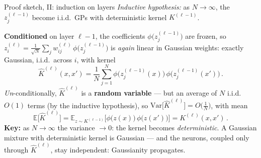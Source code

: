 \documentclass[11pt]{beamer}
\newcommand{\E}{\mathbb{E}}
\newcommand{\hl}[1]{{\color{blue!60!black}\textbf{#1}}}
\begin{document}
\begin{frame}{Proof sketch, II: induction on layers}
  \emph{Inductive hypothesis:} as $N\to\infty$, the $z^{(\ell-1)}_j$
  become i.i.d.\ GPs with deterministic kernel $K^{(\ell-1)}$.

  \hl{Conditioned} on layer $\ell-1$, the coefficients
  $\phi\big(z^{(\ell-1)}_j\big)$ are frozen, so
  $z^{(\ell)}_i = \frac{1}{\sqrt N}\sum_j w^{(\ell)}_{ij}\,
  \phi\big(z^{(\ell-1)}_j\big)$ is \emph{again} linear in Gaussian
  weights: exactly Gaussian, i.i.d.\ across $i$, with kernel
  {\small
  \[
    \widehat K^{(\ell)}(x,x') = \frac{1}{N}\sum_{j=1}^{N}
    \phi\big(z^{(\ell-1)}_j(x)\big)\,\phi\big(z^{(\ell-1)}_j(x')\big)\,.
  \]}
  \emph{Un}-conditionally, $\widehat K^{(\ell)}$ is a \hl{random
  variable} --- but an average of $N$ i.i.d.\ $O(1)$ terms (by the
  inductive hypothesis), so
  $\mathrm{Var}\big[\widehat K^{(\ell)}\big] = O\big(\tfrac1N\big)$,
  with mean
  {\small
  \[
    \E\big[\widehat K^{(\ell)}\big]
    =  \E_{z \sim K^{(\ell-1)}}
    \big[\phi\big(z(x)\big)\,\phi\big(z(x')\big)\big]
    = K^{(\ell)}(x,x')\,.
  \]}
  \hl{Key:} as $N\to\infty$ the variance $\to 0$: the kernel becomes
  \emph{deterministic}. A Gaussian mixture with deterministic kernel is
  Gaussian --- and the neurons, coupled only through
  $\widehat K^{(\ell)}$, stay independent: Gaussianity propagates.
\end{frame}
\end{document}
